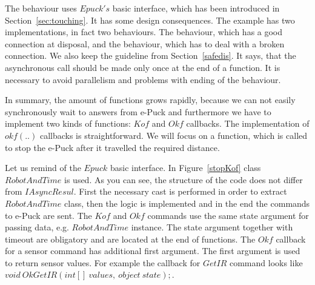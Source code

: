   The behaviour  uses $Epuck's$ basic interface,	
  which has been introduced in Section~\ref{sec:touching}.
  It has some design consequences. The example has two implementations, in fact two behaviours. 
  The behaviour, which has a good connection at disposal,
  and the behaviour, which has to deal with a broken connection.
  We also keep the guideline from Section~\ref{safedis}. 
  It says, that the asynchronous call should be made only once at the end of a function.
  It is necessary to avoid parallelism and problems with ending of the behaviour.

  In summary, the amount of functions grows rapidly, 
  because we can not easily synchronously wait to answers from e-Puck
  and furthermore we have to implement two kinds of functions: $Kof$ and $Okf$ callbacks.
  The implementation of $okf(..)$ callbacks is straightforward. 
  We will focus on a function, which is called to stop the e-Puck after it travelled the required distance.

  Let us remind of the $Epuck$ basic interface.
  In Figure~\ref{stopKof} class $RobotAndTime$ is used. 
  As you can see, the structure of the code does not differ from $IAsyncResul$. 
  First the necessary cast is performed in order to 
  extract $RobotAndTime$ class, then the logic is implemented and in the end 
  the commands to e-Puck are sent.
  The $Kof$ and $Okf$ commands use the same state argument for passing data,
  e.g. $RobotAndTime$ instance. The state argument together 
  with timeout are obligatory and are located at the end of functions.
  The $Okf$ callback for a sensor command has additional first argument. 
  The first argument is used to return sensor values. For example
  the callback for $GetIR$ command looks like $void\ OkGetIR(int[]\ values,\ object\ state);$.
  
